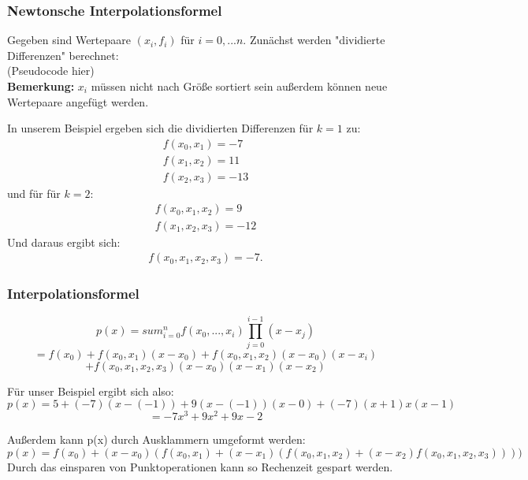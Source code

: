\documentclass{scrartcl}
\begin{document}
\subsubsection*{Newtonsche Interpolationsformel}

Gegeben sind Wertepaare $(x_i,f_i)$ für $i=0,...n$.
Zunächst werden "dividierte Differenzen" berechnet:\\
(Pseudocode hier)\\
\textbf{Bemerkung:} $x_i$ müssen nicht nach Größe sortiert sein außerdem können neue Wertepaare angefügt werden.

In unserem Beispiel ergeben sich die dividierten Differenzen für $k=1$ zu:
\begin{align*}
f(x_0,x_1)=-7\\
f(x_1,x_2)=11\\
f(x_2,x_3)=-13
\end{align*}
und für für $k=2$:
\begin{align*}
f(x_0,x_1,x_2)=9 \\
f(x_1,x_2,x_3)= -12
\end{align*}
Und daraus ergibt sich:
\begin{align*}
f(x_0,x_1,x_2,x_3)=-7.
\end{align*}

\subsubsection*{Interpolationsformel}
\begin{equation*}
p(x)= sum_{i=0}^n f(x_0,...,x_i) \prod_{j=0}^{i-1} (x-x_j)
\end{equation*}
\begin{equation*}
=f(x_0)+f(x_0,x_1)(x-x_0)+f(x_0,x_1,x_2)(x-x_0)(x-x_i)
\end{equation*}
\begin{equation*}
+f(x_0,x_1,x_2,x_3)(x-x_0)(x-x_1)(x-x_2)
\end{equation*}

Für unser Beispiel ergibt sich also:
\begin{equation*}
p(x)=5+(-7)(x-(-1))+9(x-(-1))(x-0)+(-7)(x+1) x (x-1)
\end{equation*}
\begin{equation*}
=-7x^3+9x^2+9x-2
\end{equation*}

Außerdem kann p(x) durch Ausklammern umgeformt werden:
\begin{equation*}
p(x)=f(x_0)+(x-x_0)(f(x_0,x_1)+(x-x_1)(f(x_0,x_1,x_2)+(x-x_2) f(x_0,x_1,x_2,x_3))))
\end{equation*}
Durch das einsparen von Punktoperationen kann so Rechenzeit gespart werden.
\end{document}
